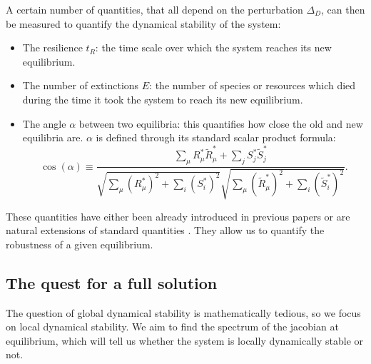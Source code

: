 \documentclass[12pt, titlepage]{report}
\begin{document}
A certain number of quantities, that all depend on the perturbation $\Delta_D$, can then be measured to quantify the dynamical stability of the system:
\begin{itemize}
  \item The resilience $t_R$: the time scale over which the system reaches its new equilibrium.
  \item The number of extinctions $E$: the number of species or resources which died during the time it took the system to reach its new equilibrium.
  \item The angle $\alpha$ between two equilibria: this quantifies how close the old and new equilibria are. $\alpha$ is defined through its standard scalar product formula:
  \begin{equation}
  \cos(\alpha) \equiv \frac{\sum_\mu R^*_\mu \tilde{R}^*_\mu + \sum_j S^*_j\tilde{S}^*_j}{\sqrt{\sum_\mu \left(R^*_\mu\right)^2 + \sum_i \left(S^*_i\right)^2}\sqrt{\sum_\mu \left(\tilde{R}^*_\mu\right)^2 + \sum_i \left(\tilde{S}^*_i\right)^2}}.
  \end{equation}
\end{itemize}
These quantities have either been already introduced in previous papers or are natural extensions of standard quantities \cite{ives_stability_2007,pascual-garcia_mutualism_2017}. They allow us to quantify the robustness of a given equilibrium.

\subsection{The quest for a full solution}
The question of global dynamical stability is mathematically tedious, so we focus on local dynamical stability.
We aim to find the spectrum of the jacobian at equilibrium, which will tell us whether the system is locally dynamically stable or not.
\end{document}
